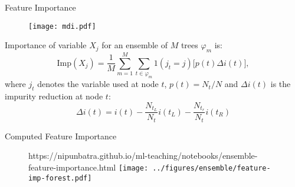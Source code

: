 \documentclass{beamer}
\begin{document}


\begin{frame}{Feature Importance\footnotemark}
  \begin{figure}
    \texttt{[image: mdi.pdf]}
  \end{figure}
  Importance of variable $X_j$ for an ensemble of $M$ trees $\varphi_{m}$ is:
  \begin{equation*}
    \text{Imp}(X_j) = \frac{1}{M} \sum_{m=1}^M \sum_{t \in \varphi_{m}} 1(j_t = j) \Big[ p(t) \Delta i(t) \Big],
  \end{equation*}
  where $j_t$ denotes the variable used at node $t$, $p(t)=N_t/N$ and $\Delta i(t)$ is the impurity reduction at node $t$:
  \begin{equation*}
    \Delta i(t) = i(t) - \frac{N_{t_L}}{N_t} i(t_L) - \frac{N_{t_r}}{N_t} i(t_R)
  \end{equation*}

\end{frame}


\begin{frame}{Computed Feature Importance}
  \begin{figure}[htp]
    \centering
    \begin{notebookbox}{https://nipunbatra.github.io/ml-teaching/notebooks/ensemble-feature-importance.html}
      \texttt{[image: ../figures/ensemble/feature-imp-forest.pdf]}
    \end{notebookbox}
\end{figure}
\end{frame}
\end{document}
